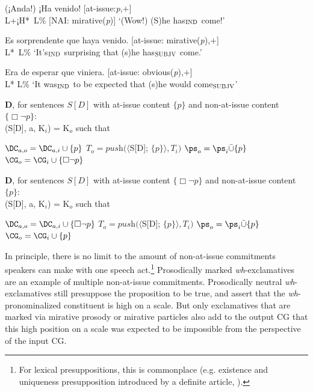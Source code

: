 \begin{exe} 
\ex \label{ex:mesorprendequehayavenido}
	\begin{xlist}
		
		\ex (¡Anda!) ¡Ha venido! \hfill [at-issue:\textit{p},$+$]\\
		\hspace*{5.5em} L+¡H*~L\% \hfill [\ac{NAI}: mirative(\textit{p})]
		\glt `(Wow!) (S)he has$_{\textsc{IND}}$ come!'
		
		\ex	Es sorprendente que haya venido. \hfill [at-issue: mirative(\textit{p}),$+$]\\
		\hspace*{11.5em} L*~L\% 
		\glt `It's$_{\textsc{IND}}$ surprising that (s)he has$_{\textsc{SUBJV}}$ come.'
		
		\ex Era de esperar que viniera. \hfill [at-issue: obvious(\textit{p}),$+$]\\
		\hspace*{9em} L* L\% 
		\glt `It was$_{\textsc{IND}}$ to be expected that (s)he would come$_{\textsc{SUBJV}}$'
	\end{xlist}

\ex\label{ex:declarativeoperatorrevised2indicativeMIR2} 
	\textbf{D}, for sentences $S[D]$ with at-issue content $\{ p \}$ and non-at-issue content $\{ \Box\neg p\}$:\\
			(S[D], a, K$_{i}$) = K$_{o}$ such that 
	\begin{xlist}
		\ex $\DC_{a,o} = \DC_{a,i}\cup \{ p \}$ 
		\ex $T_{o} = \textit{push}(\langle$S[D]; $\{ p \}\rangle, T_{i})$
		\ex $\ps_{o} = \ps_{i}\bar{\cup}\{ p \}$
		\ex $\CG_{o} = \CG_{i} \cup \{ \Box\neg p\}$
	\end{xlist}

\ex\label{ex:declarativeoperatorrevised2subjunctiveMIR2} \textbf{D}, for sentences $S[D]$ with at-issue content $\{ \Box\neg p\}$ and non-at-issue content $\{ p \}$: \\
	(S[D], a, K$_{i}$) = K$_{o}$ such that \\
	\begin{xlist}
		\ex $\DC_{a,o} = \DC_{a,i}\cup \{ \Box\neg p\}$
		\ex $T_{o} = \textit{push}(\langle$S[D]; $\{ p \}\rangle, T_{i})$
		\ex $\ps_{o} = \ps_{i}\bar{\cup}\{ p \}$
		\ex $\CG_{o} = \CG_{i} \cup\{ p \}$
	\end{xlist}
\end{exe}

In principle, there is no limit to the amount of non-at-issue commitments speakers can make with one speech act.\footnote{For lexical presuppositions, this is commonplace (e.g. existence and uniqueness presupposition introduced by a definite article, \cite[205--211]{ZimmermannSternefeld.2013}).} Prosodically marked \textit{wh}-exclamatives are an example of multiple non-at-issue commitments. Prosodically neutral \textit{wh}-exclamatives still presuppose the proposition to be true, and assert that the \textit{wh}-pronominalized constituent is high on a scale. But only exclamatives that are marked via mirative prosody or mirative particles also add to the output \ac{CG} that this high position on a scale was expected to be impossible from the perspective of the input \ac{CG}.


